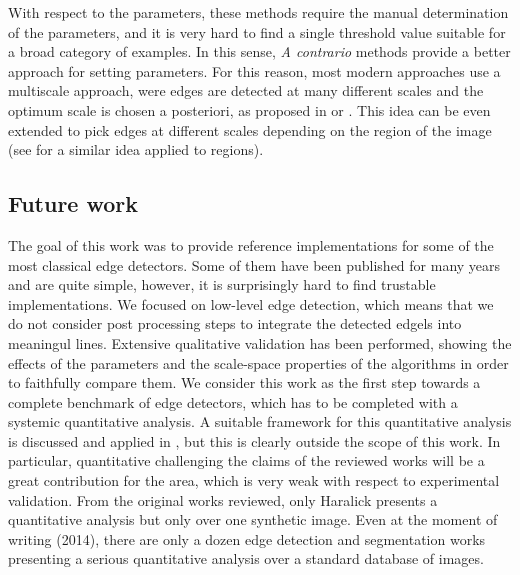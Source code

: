\documentclass{ipol}
\numberwithin{equation}{section}
\numberwithin{table}{section}
\begin{document}
With respect to the parameters, these methods require the manual determination of the parameters, and it is very hard to find a single threshold value suitable for a broad category of examples. In this sense, \emph{A contrario} methods \cite{segm:cao:03:extracting_meaningful} provide a better approach for setting parameters.
For this reason, most modern approaches use a multiscale approach, were edges are detected at many different scales and the optimum scale is chosen a posteriori, as proposed in \cite{morphology:watershed:najman:1996:geodesic_saliency} or \cite{im_proc:segmentation:arbelaez:2006:boundary_extraction}.
This idea can be even extended to pick edges at different scales depending on the region of the image (see \cite{segm:cardelino:2013:a_contrario_selection_of_optimal_partitions} for a similar idea applied to regions).

\subsection{Future work}

The goal of this work was to provide reference implementations for some of the most classical edge detectors. Some of them have been published for many years and are quite simple, however, it is surprisingly hard to find trustable implementations. We focused on low-level edge detection, which means that we do not consider post processing steps to integrate the detected edgels into meaningul lines.
Extensive qualitative validation has been performed, showing the effects of the parameters and the scale-space properties of the algorithms in order to faithfully compare them.
We consider this work as the first step towards a complete benchmark of edge detectors, which has to be completed with a systemic quantitative analysis. 
A suitable framework for this quantitative analysis is discussed and applied in \cite{segm:cardelino:2013:a_contrario_selection_of_optimal_partitions}, but this is clearly outside the scope of this work.
In particular, quantitative challenging the claims of the reviewed works will be a great contribution for the area, which is very weak with respect to experimental validation. From the original works reviewed, only Haralick presents a quantitative analysis but only over one synthetic image. Even at the moment of writing (2014), there are only a dozen edge detection and segmentation works presenting a serious quantitative analysis over a standard database of images.

\end{document}
